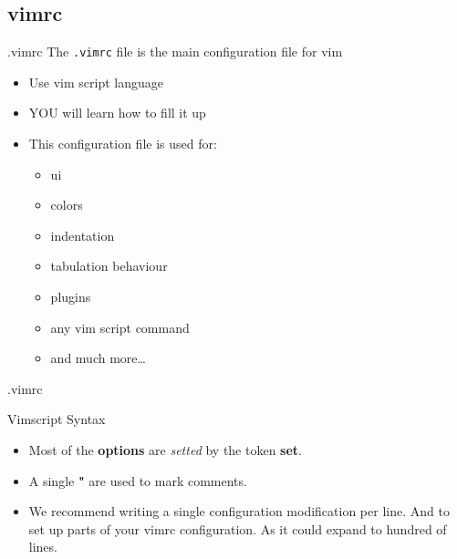 \documentclass{beamer}
\begin{document}
\subsection*{vimrc}
\begin{frame}{.vimrc}
  The \texttt{.vimrc} file is the main configuration file for vim
  \begin{itemize}
    \item Use vim script language
    \item YOU will learn how to fill it up
    \item This configuration file is used for:
      \begin{itemize}
        \item ui
        \item colors
        \item indentation
        \item tabulation behaviour
        \item plugins
        \item any vim script command
        \item and much more\dots
      \end{itemize}
  \end{itemize}
\end{frame}


\begin{frame}{.vimrc}
  \begin{block}{Vimscript Syntax}
    \begin{itemize}
      \item Most of the \textbf{options} are \textit{setted} by the token \textbf{set}.
      \item A single \textbf{"} are used to mark comments.
      \item We recommend writing a single configuration modification per line. And to set up parts of your vimrc configuration. As it could expand to hundred of lines.
    \end{itemize}
  \end{block}
\end{frame}
\end{document}
